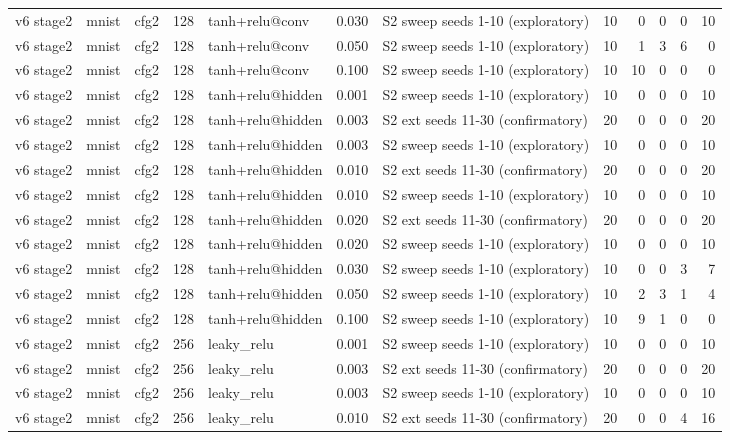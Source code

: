 \begin{table}[htbp]
{\begin{tabular}{@{}lllrlrlrrrrr@{}}
v6 stage2 & mnist & cfg2 & 128 & tanh+relu@conv & 0.030 & S2 sweep seeds 1-10 (exploratory) & 10 & 0 & 0 & 0 & 10 \\
v6 stage2 & mnist & cfg2 & 128 & tanh+relu@conv & 0.050 & S2 sweep seeds 1-10 (exploratory) & 10 & 1 & 3 & 6 & 0 \\
v6 stage2 & mnist & cfg2 & 128 & tanh+relu@conv & 0.100 & S2 sweep seeds 1-10 (exploratory) & 10 & 10 & 0 & 0 & 0 \\
v6 stage2 & mnist & cfg2 & 128 & tanh+relu@hidden & 0.001 & S2 sweep seeds 1-10 (exploratory) & 10 & 0 & 0 & 0 & 10 \\
v6 stage2 & mnist & cfg2 & 128 & tanh+relu@hidden & 0.003 & S2 ext seeds 11-30 (confirmatory) & 20 & 0 & 0 & 0 & 20 \\
v6 stage2 & mnist & cfg2 & 128 & tanh+relu@hidden & 0.003 & S2 sweep seeds 1-10 (exploratory) & 10 & 0 & 0 & 0 & 10 \\
v6 stage2 & mnist & cfg2 & 128 & tanh+relu@hidden & 0.010 & S2 ext seeds 11-30 (confirmatory) & 20 & 0 & 0 & 0 & 20 \\
v6 stage2 & mnist & cfg2 & 128 & tanh+relu@hidden & 0.010 & S2 sweep seeds 1-10 (exploratory) & 10 & 0 & 0 & 0 & 10 \\
v6 stage2 & mnist & cfg2 & 128 & tanh+relu@hidden & 0.020 & S2 ext seeds 11-30 (confirmatory) & 20 & 0 & 0 & 0 & 20 \\
v6 stage2 & mnist & cfg2 & 128 & tanh+relu@hidden & 0.020 & S2 sweep seeds 1-10 (exploratory) & 10 & 0 & 0 & 0 & 10 \\
v6 stage2 & mnist & cfg2 & 128 & tanh+relu@hidden & 0.030 & S2 sweep seeds 1-10 (exploratory) & 10 & 0 & 0 & 3 & 7 \\
v6 stage2 & mnist & cfg2 & 128 & tanh+relu@hidden & 0.050 & S2 sweep seeds 1-10 (exploratory) & 10 & 2 & 3 & 1 & 4 \\
v6 stage2 & mnist & cfg2 & 128 & tanh+relu@hidden & 0.100 & S2 sweep seeds 1-10 (exploratory) & 10 & 9 & 1 & 0 & 0 \\
v6 stage2 & mnist & cfg2 & 256 & leaky\_relu & 0.001 & S2 sweep seeds 1-10 (exploratory) & 10 & 0 & 0 & 0 & 10 \\
v6 stage2 & mnist & cfg2 & 256 & leaky\_relu & 0.003 & S2 ext seeds 11-30 (confirmatory) & 20 & 0 & 0 & 0 & 20 \\
v6 stage2 & mnist & cfg2 & 256 & leaky\_relu & 0.003 & S2 sweep seeds 1-10 (exploratory) & 10 & 0 & 0 & 0 & 10 \\
v6 stage2 & mnist & cfg2 & 256 & leaky\_relu & 0.010 & S2 ext seeds 11-30 (confirmatory) & 20 & 0 & 0 & 4 & 16 \\

\end{tabular}}
\end{table}
